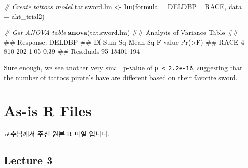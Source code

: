 \documentclass[12pt,]{krantz}
\makeatletter
\newenvironment{Shaded}{\begin{snugshade}}{\end{snugshade}}
\newcommand{\KeywordTok}[1]{\textcolor[rgb]{0.13,0.29,0.53}{\textbf{#1}}}
\newcommand{\DataTypeTok}[1]{\textcolor[rgb]{0.13,0.29,0.53}{#1}}
\newcommand{\StringTok}[1]{\textcolor[rgb]{0.31,0.60,0.02}{#1}}
\newcommand{\CommentTok}[1]{\textcolor[rgb]{0.56,0.35,0.01}{\textit{#1}}}
\newcommand{\OperatorTok}[1]{\textcolor[rgb]{0.81,0.36,0.00}{\textbf{#1}}}
\newcommand{\NormalTok}[1]{#1}
\newenvironment{kframe}{%
\medskip{}
\setlength{\fboxsep}{.8em}
 \def\at@end@of@kframe{}%
 \ifinner\ifhmode%
  \def\at@end@of@kframe{\end{minipage}}%
  \begin{minipage}{\columnwidth}%
 \fi\fi%
 \def\FrameCommand##1{\hskip\@totalleftmargin \hskip-\fboxsep
 \colorbox{shadecolor}{##1}\hskip-\fboxsep
     \hskip-\linewidth \hskip-\@totalleftmargin \hskip\columnwidth}%
 \MakeFramed {\advance\hsize-\width
   \@totalleftmargin\z@ \linewidth\hsize
   \@setminipage}}%
 {\par\unskip\endMakeFramed%
 \at@end@of@kframe}
\renewenvironment{Shaded}{\begin{kframe}}{\end{kframe}}
\theoremstyle{definition}
\theoremstyle{definition}
\theoremstyle{remark}
\makeatother
\begin{document}
\begin{Shaded}
\begin{Highlighting}[]
\CommentTok{# Create tattoos model}
\NormalTok{tat.sword.lm <-}\StringTok{ }\KeywordTok{lm}\NormalTok{(}\DataTypeTok{formula =}\NormalTok{ DELDBP }\OperatorTok{~}\StringTok{ }\NormalTok{RACE,}
                   \DataTypeTok{data =}\NormalTok{ aht_trial2)}

\CommentTok{# Get ANOVA table}
\KeywordTok{anova}\NormalTok{(tat.sword.lm)}
\NormalTok{## Analysis of Variance Table}
\NormalTok{## }
\NormalTok{## Response: DELDBP}
\NormalTok{##           Df Sum Sq Mean Sq F value Pr(>F)}
\NormalTok{## RACE       4    810     202    1.05   0.39}
\NormalTok{## Residuals 95  18401     194}
\end{Highlighting}
\end{Shaded}

Sure enough, we see another very small p-value of
\texttt{p\ \textless{}\ 2.2e-16}, suggesting that the number of tattoos
pirate's have are different based on their favorite sword.

\cleardoublepage 

\appendix {}


\chapter{As-is R Files}\label{as-is-r-files}

교수님께서 주신 원본 R 파일 입니다.

\section{Lecture 3}\label{lecture-3}
\end{document}
